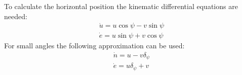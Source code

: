 \documentclass[tikz, border=10pt]{standalone}
\begin{document}
    \begin{tcolorbox}[frogbox, title=A Frogbox, fonttitle=\sffamily\bfseries]
        \sffamily
        To calculate the horizontal position the kinematic differential equations are needed:\\
        \begin{align}
            \dot{u}=u\cos{\psi}-v\sin{\psi}\\
            \dot{e}=u\sin{\psi}+v\cos{\psi}
        \end{align}
        For small angles the following approximation can be used:\\
        \begin{align}
            \dot{n}=u-v\delta_{\psi}\\
            \dot{e}=u\delta_{\psi}+v
        \end{align}
    \end{tcolorbox}
\end{document}
